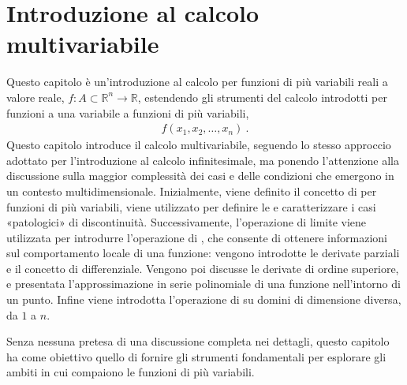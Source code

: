 \documentclass[letterpaper,10pt,italian]{jupyterBook}
\begin{document}
\chapter{Introduzione al calcolo multi\sphinxhyphen{}variabile}
\label{\detokenize{ch/multivariable-calculus:introduzione-al-calcolo-multi-variabile}}\label{\detokenize{ch/multivariable-calculus:multivariable-calculus}}\label{\detokenize{ch/multivariable-calculus::doc}}
\sphinxAtStartPar
Questo capitolo è un’introduzione al calcolo per funzioni di più variabili reali a valore reale, \(f: A \subset \mathbb{R}^n \rightarrow \mathbb{R}\), estendendo gli strumenti del calcolo introdotti per funzioni a una variabile a funzioni di più variabili,
\begin{equation*}
\begin{split}f(x_1, x_2, \dots, x_n) \ .\end{split}
\end{equation*}
\sphinxAtStartPar
{} Questo capitolo introduce il calcolo multivariabile, seguendo lo stesso approccio adottato per l’introduzione al calcolo infinitesimale, ma ponendo l’attenzione alla discussione sulla maggior complessità dei casi e delle condizioni che emergono in un contesto multidimensionale.
Inizialmente, viene definito il concetto di {\hyperref[\detokenize{ch/multivariable-calculus/limits:multivariable-calculus-limit}]{}} per funzioni di più variabili, viene utilizzato per definire le {\hyperref[\detokenize{ch/multivariable-calculus/limits:multivariable-calculus-continuity}]{}} e caratterizzare i casi «patologici» di discontinuità.
Successivamente, l’operazione di limite viene utilizzata per introdurre l’operazione di {\hyperref[\detokenize{ch/multivariable-calculus/derivatives:multivariable-calculus-derivatives}]{}}, che consente di ottenere informazioni sul comportamento locale di una funzione: vengono introdotte le derivate parziali e il concetto di differenziale. Vengono poi discusse le derivate di ordine superiore, e presentata l’approssimazione in serie polinomiale di una funzione nell’intorno di un punto.
Infine viene introdotta l’operazione di {\hyperref[\detokenize{ch/multivariable-calculus/integrals:multivariable-calculus-integrals}]{}} su domini di dimensione diversa, da \(1\) a \(n\).

\sphinxAtStartPar
Senza nessuna pretesa di una discussione completa nei dettagli, questo capitolo ha come obiettivo quello di fornire gli strumenti fondamentali per esplorare gli ambiti in cui compaiono le funzioni di più variabili.  
\end{document}
